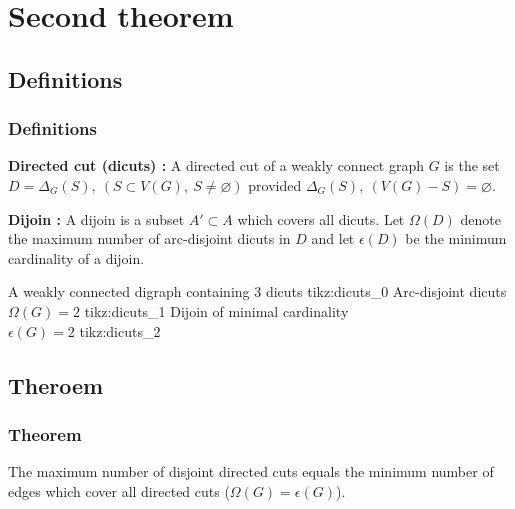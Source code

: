 \documentclass[8pt]{beamer}
\begin{document}
\section{Second theorem}
\subsection{Definitions}
\begin{frame}
\frametitle{Definitions}
\begin{block}
\textbf{Directed cut (dicuts) :}
A directed cut of a weakly connect graph $G$ is the set $D = \Delta_G(S),\ (S \subset V(G),\ S \neq \varnothing)$ provided $\Delta_G(S),\ (V(G) - S) = \varnothing$.

\end{block}

\begin{block}
\textbf{Dijoin :} A dijoin is a subset $A' \subset A$ which covers all dicuts. Let $\Omega(D)$ denote the maximum number of arc-disjoint dicuts in $D$ 
and let $\epsilon(D)$ be the minimum cardinality of a dijoin.

\end{block}    

\threesplitpage
{
    {A weakly connected digraph containing 3 dicuts}
    {tikz:dicuts_0}
}{
    {Arc-disjoint dicuts\\$\Omega(G) = 2$}
    {tikz:dicuts_1}
}{
    {Dijoin of minimal cardinality\\$\epsilon(G) = 2$}
    {tikz:dicuts_2}
}

\end{frame}

\subsection{Theroem}
\begin{frame}
\frametitle{Theorem}
    
\begin{Lucchesi_and_Younger}
The maximum number of disjoint directed cuts equals the minimum number of edges which cover all directed cuts ($\Omega(G) = \epsilon(G)$).
\end{Lucchesi_and_Younger}

\end{frame}
\end{document}
